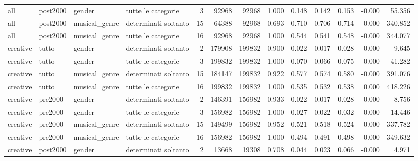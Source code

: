 \begin{table}
\begin{tabular}{llllrrrrrrrrr}
        all & post2000 &        gender &   tutte le categorie &            3 &        92968 &         92968 &              1.000 & 0.148 &  0.142 &  0.153 &  -0.000 &  55.356 \\
        all & post2000 & musical\_genre & determinati soltanto &           15 &        64388 &         92968 &              0.693 & 0.710 &  0.706 &  0.714 &   0.000 & 340.852 \\
        all & post2000 & musical\_genre &   tutte le categorie &           16 &        92968 &         92968 &              1.000 & 0.544 &  0.541 &  0.548 &  -0.000 & 344.077 \\
   creative &    tutto &        gender & determinati soltanto &            2 &       179908 &        199832 &              0.900 & 0.022 &  0.017 &  0.028 &  -0.000 &   9.645 \\
   creative &    tutto &        gender &   tutte le categorie &            3 &       199832 &        199832 &              1.000 & 0.070 &  0.066 &  0.075 &   0.000 &  41.282 \\
   creative &    tutto & musical\_genre & determinati soltanto &           15 &       184147 &        199832 &              0.922 & 0.577 &  0.574 &  0.580 &  -0.000 & 391.076 \\
   creative &    tutto & musical\_genre &   tutte le categorie &           16 &       199832 &        199832 &              1.000 & 0.535 &  0.532 &  0.538 &   0.000 & 418.226 \\
   creative &  pre2000 &        gender & determinati soltanto &            2 &       146391 &        156982 &              0.933 & 0.022 &  0.017 &  0.028 &   0.000 &   8.756 \\
   creative &  pre2000 &        gender &   tutte le categorie &            3 &       156982 &        156982 &              1.000 & 0.027 &  0.022 &  0.032 &  -0.000 &  14.446 \\
   creative &  pre2000 & musical\_genre & determinati soltanto &           15 &       149499 &        156982 &              0.952 & 0.521 &  0.518 &  0.524 &   0.000 & 337.782 \\
   creative &  pre2000 & musical\_genre &   tutte le categorie &           16 &       156982 &        156982 &              1.000 & 0.494 &  0.491 &  0.498 &  -0.000 & 349.632 \\
   creative & post2000 &        gender & determinati soltanto &            2 &        13668 &         19308 &              0.708 & 0.044 &  0.023 &  0.066 &  -0.000 &   4.971 \\

\end{tabular}
\end{table}

